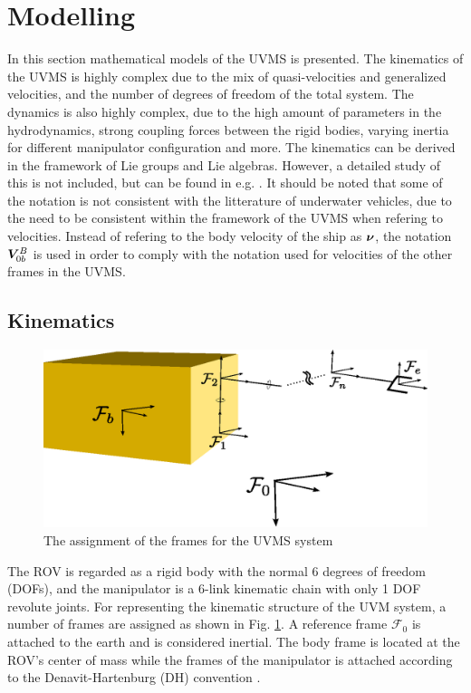 
\section{Modelling}

In this section mathematical models of the UVMS is presented. The kinematics of the UVMS is highly complex due to the mix of quasi-velocities and generalized velocities, and the number of degrees of freedom of the total system. 
The dynamics is also highly complex, due to the high amount of parameters in the hydrodynamics, strong coupling forces between the rigid bodies, varying inertia for different manipulator configuration and more. The kinematics can be derived in the framework of Lie groups and Lie algebras. However, a detailed study of this is not included, but can be found in e.g. \cite{kristin_jant}. It should be noted that some of the notation is not consistent with the  litterature of underwater vehicles, due to the need to be consistent within the framework of the UVMS when refering to velocities. Instead of refering to the body velocity of the ship as $ \boldsymbol \nu$, the notation $ \boldsymbol V_{0b}^B$ is used in order to comply with the notation used for velocities of the other frames in the UVMS. 
 

\subsection{Kinematics}

\begin{figure}[h!]
  \centering
  \includegraphics[scale=0.6]{./figures/uvms_kinematics.eps}
  \caption{The assignment of the frames for the UVMS system}
  \label{fig:uvms_kinematics}
\end{figure}
The ROV is regarded as a rigid body with the normal 6 degrees of freedom (DOFs), and the manipulator is a 6-link kinematic chain with only 1 DOF revolute joints. For representing the kinematic structure of the UVM system, a number of frames are assigned as shown in Fig. \ref{fig:uvms_kinematics}. A reference frame $\mathcal{F}_0$ is attached to the earth and is considered inertial. The body frame is located at the ROV's center of mass while the frames of the manipulator is attached according to the Denavit-Hartenburg (DH) convention \cite{spong2005robot}. 


